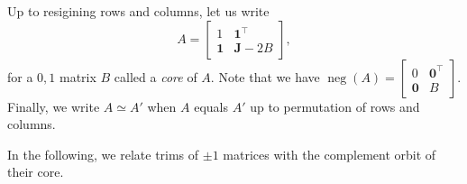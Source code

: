 \documentclass[11pt,a4paper]{amsart}
\theoremstyle{plain}
\theoremstyle{definition}
\DeclareMathOperator{\nega}{neg}
\begin{document}
Up to resigining rows and columns, let us write
\begin{equation}\label{equation:core}
A=\begin{bmatrix}
1 & \mathbf{1}^\top \\
\mathbf{1} & \mathbf{J} - 2B
\end{bmatrix},
\end{equation}
for a $0,\!1$ matrix $B$ called a \emph{core} of $A$.
Note that we have $\nega{(A)} = \begin{bmatrix}
0&\mathbf{0}^\top\\
\mathbf{0} & B
\end{bmatrix}$.
Finally, we write $A\simeq A'$ when $A$ equals $A'$ up to permutation of rows and columns.
\medskip

In the following, we relate trims of $\pm1$ matrices with the complement orbit of their core.
\end{document}
